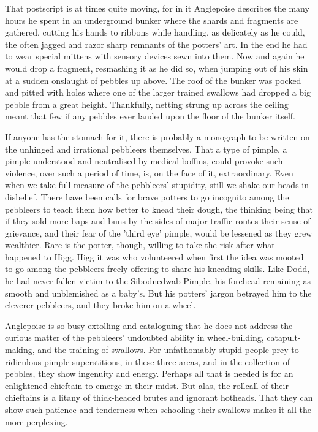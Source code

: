 That postscript is at times quite moving, for in it Anglepoise describes the many hours he spent in an underground bunker where the shards and fragments are gathered, cutting his hands to ribbons while handling, as delicately as he could, the often jagged and razor sharp remnants of the potters' art. In the end he had to wear special mittens with sensory devices sewn into them. Now and again he would drop a fragment, resmashing it as he did so, when jumping out of his skin at a sudden onslaught of pebbles up above. The roof of the bunker was pocked and pitted with holes where one of the larger trained swallows had dropped a big pebble from a great height. Thankfully, netting strung up across the ceiling meant that few if any pebbles ever landed upon the floor of the bunker itself.

If anyone has the stomach for it, there is probably a monograph to be written on the unhinged and irrational pebbleers themselves. That a type of pimple, a pimple understood and neutralised by medical boffins, could provoke such violence, over such a period of time, is, on the face of it, extraordinary. Even when we take full measure of the pebbleers' stupidity, still we shake our heads in disbelief. There have been calls for brave potters to go incognito among the pebbleers to teach them how better to knead their dough, the thinking being that if they sold more baps and buns by the sides of major traffic routes their sense of grievance, and their fear of the 'third eye' pimple, would be lessened as they grew wealthier. Rare is the potter, though, willing to take the risk after what happened to Higg. Higg it was who volunteered when first the idea was mooted to go among the pebbleers freely offering to share his kneading skills. Like Dodd, he had never fallen victim to the Sibodnedwab Pimple, his forehead remaining as smooth and unblemished as a baby's. But his potters' jargon betrayed him to the cleverer pebbleers, and they broke him on a wheel.

Anglepoise is so busy extolling and cataloguing that he does not address the curious matter of the pebbleers' undoubted ability in wheel-building, catapult-making, and the training of swallows. For unfathomably stupid people prey to ridiculous pimple superstitions, in these three areas, and in the collection of pebbles, they show ingenuity and energy. Perhaps all that is needed is for an enlightened chieftain to emerge in their midst. But alas, the rollcall of their chieftains is a litany of thick-headed brutes and ignorant hotheads. That they can show such patience and tenderness when schooling their swallows makes it all the more perplexing.

